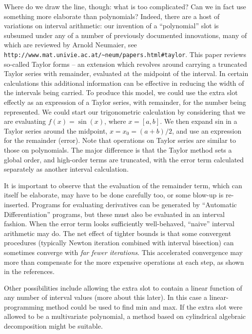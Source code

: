 \documentclass{article}
\begin{document}
Where do we draw the line, though: what is too complicated? Can we in fact
use something more elaborate than polynomials? Indeed, there are
a host of variations on interval arithmetic: our invention of a
``polynomial'' slot is subsumed under any of a number of previously documented
innovations, many of which are reviewed by Arnold Neumaier, see
\verb|http://www.mat.univie.ac.at/~neum/papers.html#taylor|.  This paper
reviews so-called Taylor forms -- an extension which revolves around carrying
a truncated Taylor series with remainder, evaluated at the midpoint of
the interval. In certain calculations this additional information can
be effective in reducing the width of the intervals being
carried.  To produce this model, we could use the extra slot
effectly as an expression of a Taylor series, with remainder, for the
number being represented.  We could start our trigonometric
calculation by considering that we are evaluating $f(x)=\sin(x)$,
where $x=[a,b]$.  We then expand sin in a Taylor series around the
midpoint, $x=x_0=(a+b)/2$, and use an expression for the remainder (error).
Note that operations on Taylor series are similar to those on polynomials. The
major difference is that the Taylor method sets a global order, and
high-order terms are truncated, with the error term calculated separately as
another interval calculation.


It is important to observe that the evaluation of the remainder term,
which can itself be elaborate, may have to be done carefully too, or
some blow-up is re-inserted.  Programs for evaluating derivatives can
be generated by ``Automatic Differentiation'' programs, but these must
also be evaluated in an interval fashion. When the error term looks
sufficiently well-behaved, ``naive'' interval arithmetic may do. The
net effect of tighter bounds is that some convergent procedures
(typically Newton iteration combined with interval bisection) can
sometimes converge with {\em far fewer iterations}. This accelerated
convergence may more than compensate for the more expensive operations
at each step, as shown in the references.

Other possibilities include allowing the extra slot to contain  a
linear function of any number of interval values (more about this later). In this case a
linear-programming method could be used to find min and max.  If the
extra slot were allowed to be a multivariate polynomial, a method
based on cylindrical algebraic decomposition might be suitable.
\end{document}
